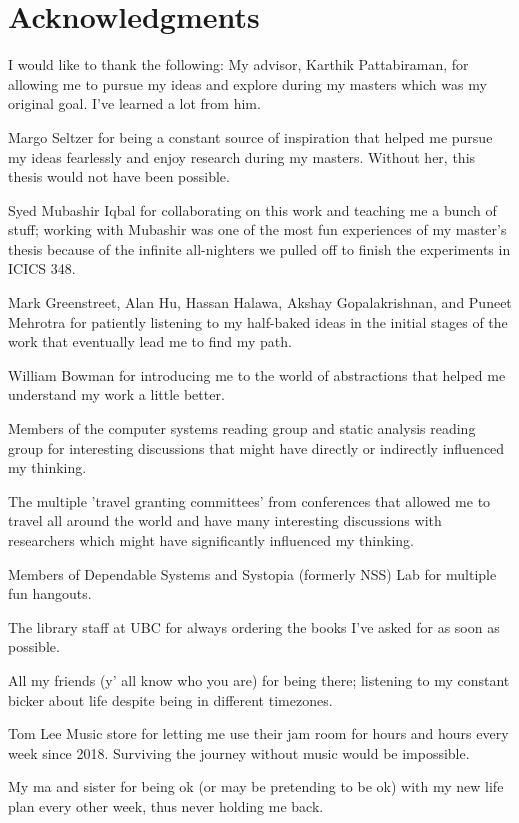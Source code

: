 
\chapter{Acknowledgments}

I would like to thank the following:
My advisor, Karthik Pattabiraman, for allowing me to pursue my ideas and explore during my masters which was my original goal. I've learned a lot from him. 

Margo Seltzer for being a constant source of inspiration that helped me pursue my ideas fearlessly and enjoy research during my masters. Without her, this thesis would not have been possible. 

Syed Mubashir Iqbal for collaborating on this work and teaching me a bunch of stuff; working with Mubashir was one of the most fun experiences of my master's thesis because of the infinite all-nighters we pulled off to finish the experiments in ICICS 348. 

Mark Greenstreet, Alan Hu, Hassan Halawa, Akshay Gopalakrishnan, and Puneet Mehrotra for patiently listening to my half-baked ideas in the initial stages of the work that eventually lead me to find my path. 

William Bowman for introducing me to the world of abstractions that helped me understand my work a little better.  

Members of the computer systems reading group and static analysis reading group for interesting discussions that might have directly or indirectly influenced my thinking. 

The multiple 'travel granting committees' from conferences that allowed me to
travel all around the world and have many interesting discussions with researchers which might have significantly influenced my thinking. 

Members of Dependable Systems and Systopia (formerly NSS) Lab for multiple fun hangouts. 

The library staff at UBC for always ordering the books I've asked for as soon as possible.

All my friends (y' all know who you are) for being there; listening to my constant bicker about life despite being in different timezones.   

Tom Lee Music store for letting me use their jam room for hours and hours every week since 2018. Surviving the journey without music would be impossible. 

My ma and sister for being ok (or may be pretending to be ok) with my new life plan every other week, thus never holding me back. 




